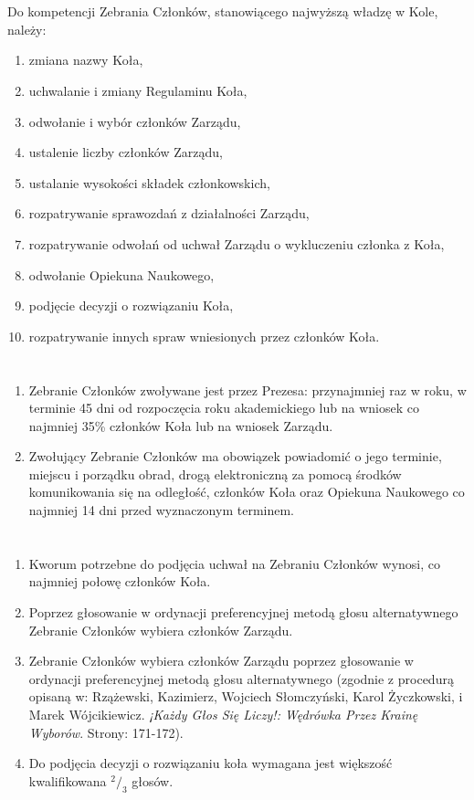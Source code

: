 \documentclass[a4paper]{article}
\begin{document}
\section{}
Do kompetencji Zebrania Członków, stanowiącego najwyższą władzę w Kole, należy:
  \begin{enumerate}[label=\alph*)]
  \item zmiana nazwy Koła,
  \item uchwalanie i zmiany Regulaminu Koła,
  \item odwołanie i wybór członków Zarządu, 
  \item ustalenie liczby członków Zarządu,
  \item ustalanie wysokości składek członkowskich,
  \item rozpatrywanie sprawozdań z działalności Zarządu,
  \item rozpatrywanie odwołań od uchwał Zarządu o wykluczeniu członka z Koła,
  \item odwołanie Opiekuna Naukowego,
  \item podjęcie decyzji o rozwiązaniu Koła,
  \item rozpatrywanie innych spraw wniesionych przez członków Koła.
  \end{enumerate}

\section{}
\label{Tryb}
\begin{enumerate}
\item Zebranie Członków zwoływane jest przez Prezesa: przynajmniej raz w roku, w terminie 45 dni od rozpoczęcia roku akademickiego lub na wniosek co najmniej 35\% członków Koła lub na wniosek Zarządu.
\item Zwołujący Zebranie Członków ma obowiązek powiadomić o jego terminie, miejscu i porządku obrad, drogą elektroniczną za pomocą środków komunikowania się na odległość, członków Koła oraz Opiekuna Naukowego co najmniej 14 dni przed wyznaczonym terminem.
\end{enumerate}

\section{}

\begin{enumerate}
\label{kworum}
\item Kworum potrzebne do podjęcia uchwał na Zebraniu Członków wynosi, co najmniej połowę członków Koła.
\item Poprzez głosowanie w ordynacji preferencyjnej metodą głosu alternatywnego Zebranie Członków wybiera członków Zarządu.
\item Zebranie Członków wybiera członków Zarządu poprzez głosowanie w ordynacji preferencyjnej metodą głosu alternatywnego (zgodnie z procedurą opisaną w: Rzążewski, Kazimierz, Wojciech Słomczyński, Karol Życzkowski, i Marek Wójcikiewicz. \textit{¡Każdy Głos Się Liczy!: Wędrówka Przez Krainę Wyborów}. Strony: 171-172).
\item Do podjęcia decyzji o rozwiązaniu koła wymagana jest większość kwalifikowana $^2/_3$ głosów.
\end{enumerate}
\end{document}
